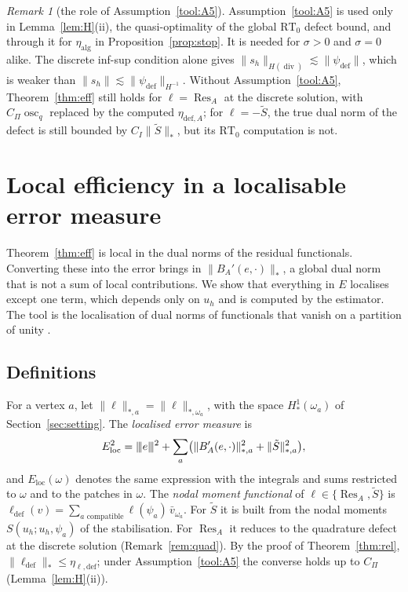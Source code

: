 \documentclass[11pt]{article}
\newcommand{\tnorm}[1]{\lvert\kern-0.25ex\lvert\kern-0.25ex\lvert #1\rvert\kern-0.25ex\rvert\kern-0.25ex\rvert}
\newcommand{\Res}{\operatorname{Res}}
\newcommand{\osc}{\operatorname{osc}}
\newcommand{\Stil}{\tilde S}
\newcommand{\RT}{\mathrm{RT}}
\newcommand{\Hdiv}{H(\operatorname{div})}
\newcommand{\defe}{\mathrm{def}}
\theoremstyle{plain}
\theoremstyle{remark}
\newtheorem{remark}[theorem]{Remark}
\numberwithin{equation}{section}
\begin{document}
\begin{remark}[the role of Assumption~\ref{tool:A5}]\label{rem:A5}
Assumption~\ref{tool:A5} is used only in Lemma~\ref{lem:H}(ii), the quasi-optimality of the global
$\RT_0$ defect bound, and through it for $\eta_{\mathrm{alg}}$ in Proposition~\ref{prop:stop}. It
is needed for $\sigma>0$ and $\sigma=0$ alike. The discrete inf-sup condition alone gives
$\|s_h\|_{\Hdiv}\lesssim\|\psi_\defe\|$, which is weaker than
$\|s_h\|\lesssim\|\psi_\defe\|_{H^{-1}}$. Without Assumption~\ref{tool:A5}, Theorem~\ref{thm:eff}
still holds for $\ell=\Res_A$ at the discrete solution, with $C_\Pi\osc_q$ replaced by the computed
$\eta_{\defe,A}$; for $\ell=-\Stil$, the true dual norm of the defect is still bounded by
$C_I\|\Stil\|_*$, but its $\RT_0$ computation is not.
\end{remark}

\section{Local efficiency in a localisable error measure}\label{sec:loc}

Theorem~\ref{thm:eff} is local in the dual norms of the residual functionals. Converting these into
the error brings in $\|B_A'(e,\cdot)\|_*$, a global dual norm that is not a sum of local
contributions. We show that everything in $E$ localises except one term, which depends only on $u_h$
and is computed by the estimator. The tool is the localisation of dual norms of functionals that
vanish on a partition of unity \cite{BMV}.

\subsection{Definitions}

For a vertex $a$, let $\|\ell\|_{*,a}=\|\ell\|_{*,\omega_a}$, with the space $H^1_*(\omega_a)$ of
Section~\ref{sec:setting}. The \emph{localised error measure} is
\[
  E_{\mathrm{loc}}^2=\tnorm{e}^2+\sum_a\bigl(\|B_A'(e,\cdot)\|_{*,a}^2+\|\Stil\|_{*,a}^2\bigr),
\]
and $E_{\mathrm{loc}}(\omega)$ denotes the same expression with the integrals and sums restricted to
$\omega$ and to the patches in $\omega$. The \emph{nodal moment functional} of
$\ell\in\{\Res_A,\Stil\}$ is $\ell_\defe(v)=\sum_{a\text{ compatible}}\ell(\psi_a)\,\bar v_{\omega_a}$.
For $\Stil$ it is built from the nodal moments $S(u_h;u_h,\psi_a)$ of the stabilisation. For
$\Res_A$ it reduces to the quadrature defect at the discrete solution (Remark~\ref{rem:quad}). By the
proof of Theorem~\ref{thm:rel}, $\|\ell_\defe\|_*\le\eta_{\ell,\defe}$; under
Assumption~\ref{tool:A5} the converse holds up to $C_\Pi$ (Lemma~\ref{lem:H}(ii)).
\end{document}
